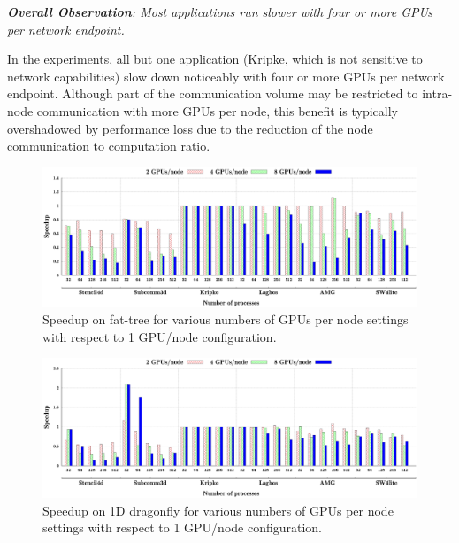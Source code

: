 

\vspace{1em}
\noindent
{\it \textbf{Overall Observation}:
Most applications run slower with four or more GPUs per network endpoint.} 

\noindent In the experiments, all but one application (Kripke, which is not
sensitive to network capabilities) slow down noticeably with four or more GPUs per network
endpoint.
Although part of the communication volume may be restricted to intra-node communication
with more GPUs per node, this benefit is typically overshadowed by performance
loss due to the reduction of the node communication to computation ratio.  

\FloatBarrier
\begin{figure}[h] 
\centering
\includegraphics[width=\textwidth]{plots/ftree/map/ftree-mapping-all.eps}
\caption{Speedup on fat-tree for various numbers of GPUs per node settings with
respect to 1 GPU/node configuration.}
\label{fig:ftree_gpu}
\end{figure}
\FloatBarrier

\FloatBarrier
\begin{figure}[!htbp]
\centering
\includegraphics[width=\textwidth]{plots/dfly/map/dfly-mapping-all.eps}
\caption{Speedup on 1D dragonfly for various numbers of GPUs per node settings with
respect to 1 GPU/node configuration.}
\label{fig:dfly_gpu}
\end{figure}
\FloatBarrier



